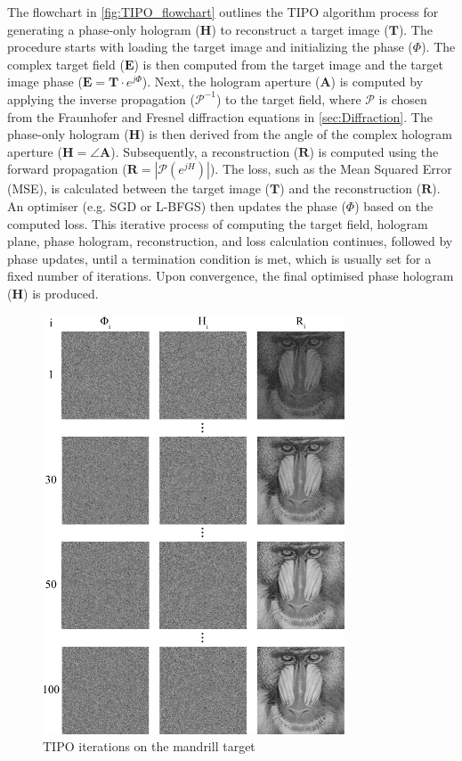 The flowchart in \cref{fig:TIPO_flowchart} outlines the TIPO algorithm process for generating a phase-only hologram ($\textbf{H}$) to reconstruct a target image ($\textbf{T}$). The procedure starts with loading the target image and initializing the phase ($\Phi$). The complex target field ($\textbf{E}$) is then computed from the target image and the target image phase ($\textbf{E} = \textbf{T} \cdot e^{j\Phi}$). Next, the hologram aperture ($\textbf{A}$) is computed by applying the inverse propagation ($\mathcal{P}^{-1}$) to the target field, where $\mathcal{P}$ is chosen from the Fraunhofer and Fresnel diffraction equations in \cref{sec:Diffraction}. The phase-only hologram ($\textbf{H}$) is then derived from the angle of the complex hologram aperture ($\textbf{H} = \angle \textbf{A}$). Subsequently, a reconstruction ($\textbf{R}$) is computed using the forward propagation ($\textbf{R} = |\mathcal{P}(e^{jH})|$). The loss, such as the Mean Squared Error (MSE), is calculated between the target image ($\textbf{T}$) and the reconstruction ($\textbf{R}$). An optimiser (e.g. SGD or L-BFGS) then updates the phase ($\Phi$) based on the computed loss. This iterative process of computing the target field, hologram plane, phase hologram, reconstruction, and loss calculation continues, followed by phase updates, until a termination condition is met, which is usually set for a fixed number of iterations. Upon convergence, the final optimised phase hologram ($\textbf{H}$) is produced.

\begin{figure}[H]
	\centering
	\includegraphics[width=0.8\textwidth]{TIPO_iters.pdf}
	\caption{TIPO iterations on the mandrill target}
	\label{fig:TIPO_iters}
\end{figure}

